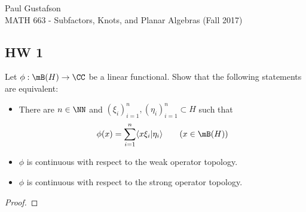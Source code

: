 \documentclass{article}
\begin{document}
\noindent Paul Gustafson\\
\noindent MATH 663 - Subfactors, Knots, and Planar Algebras (Fall 2017)

\subsection*{HW 1}
 Let $\phi: \mB(H) \to \CC$ be a linear functional. Show that the following statements are equivalent:
\begin{itemize}[(a)]
\item There are $n \in \NN$ and $(\xi_i)_{i=1}^n, (\eta_i)_{i=1}^n \subset H$ such that
  $$ \phi(x) = \sum_{i=1}^n \langle x \xi_i | \eta_i \rangle \qquad (x \in \mB(H))$$
\item $\phi$ is continuous with respect to the weak operator topology.
 \item $\phi$ is continuous with respect to the strong operator topology.
\end{itemize}
\begin{proof}
\end{proof}
\end{document}
